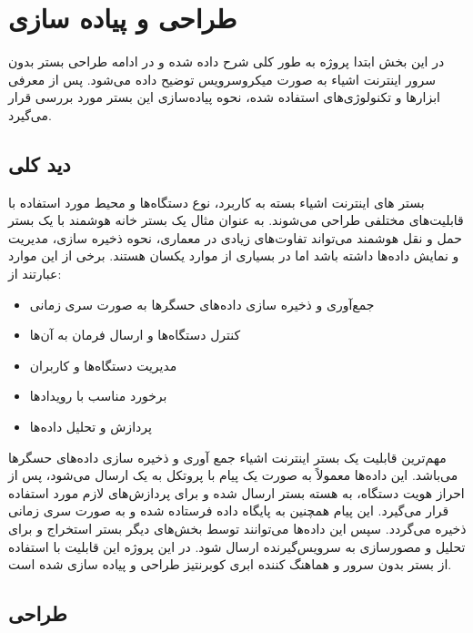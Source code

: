 \chapter{طراحی و پیاده سازی}\label{chapter3}

در این بخش ابتدا پروژه به طور کلی شرح داده شده و در ادامه طراحی بستر بدون سرور اینترنت اشیاء به صورت میکروسرویس توضیح داده می‌شود. پس از معرفی ابزارها و تکنولوژی‌های استفاده شده، نحوه پیاده‌سازی این بستر مورد بررسی قرار می‌گیرد.

\section{دید کلی}

بستر های اینترنت اشیاء بسته به کاربرد، نوع دستگاه‌ها و محیط مورد استفاده با قابلیت‌های مختلفی طراحی می‌شوند. به عنوان مثال یک بستر خانه هوشمند با یک بستر حمل و نقل هوشمند می‌تواند تفاوت‌های زیادی در معماری، نحوه ذخیره سازی، مدیریت و نمایش داده‌ها داشته باشد اما در بسیاری از موارد یکسان هستند. برخی از این موارد عبارتند از:
\begin{itemize}
	
	\item جمع‌‌آوری و ذخیره سازی داده‌های حسگر‌ها به صورت سری زمانی
	
	\item کنترل دستگاه‌ها و ارسال فرمان به آن‌ها
	
	\item مدیریت دستگاه‌ها و کاربران
	
	\item برخورد مناسب با رویداد‌ها
	
	\item پردازش و تحلیل داده‌ها
	
\end{itemize}

مهم‌ترین قابلیت یک بستر اینترنت اشیاء جمع آوری و ذخیره سازی داده‌های حسگر‌ها می‌باشد. این داده‌ها معمولاً به صورت یک پیام با پروتکل  به یک  ارسال می‌شود، پس از احراز هویت دستگاه، به هسته بستر ارسال شده و برای پردازش‌های لازم مورد استفاده قرار می‌گیرد. این پیام همچنین به پایگاه داده فرستاده شده و به صورت سری زمانی ذخیره می‌گردد. سپس این داده‌ها می‌توانند توسط بخش‌های دیگر بستر استخراج و برای تحلیل و مصورسازی به سرویس‌گیرنده ارسال شود. در این پروژه این قابلیت با استفاده از بستر بدون سرور  و هماهنگ کننده ابری ‌کوبرنتیز طراحی و پیاده سازی شده است.

\newpage

\section{طراحی}

